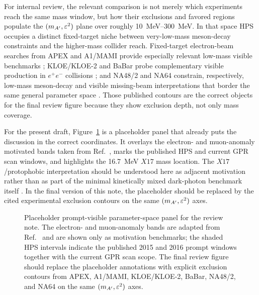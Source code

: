 For internal review, the relevant comparison is not merely which experiments reach the
same mass window, but how their exclusions and favored regions populate the
$(m_{A^\prime},\varepsilon^2)$ plane over roughly \SIrange{10}{300}{MeV}. In that space HPS
occupies a distinct fixed-target niche between very-low-mass meson-decay constraints
and the higher-mass collider reach. Fixed-target electron-beam searches from APEX and
A1/MAMI provide especially relevant low-mass visible benchmarks
\cite{APEX2011,A1MAMI2014}; KLOE/KLOE-2 and BaBar probe complementary visible
production in $e^+e^-$ collisions \cite{KLOE2013,KLOE22015,BaBarDarkPhoton2014}; and
NA48/2 and NA64 constrain, respectively, low-mass meson-decay and visible missing-beam
interpretations that border the same general parameter space
\cite{NA48DarkPhoton2015,NA64X17Visible2021}. Those published contours are the correct
objects for the final review figure because they show exclusion depth, not only mass
coverage.

For the present draft, Figure~\ref{fig:prompt-visible-constraints} is a placeholder
panel that already puts the discussion in the correct coordinates. It overlays the
electron- and muon-anomaly motivated bands taken from
Ref.~\cite{PeetsX17g2Comparison2026}, marks the published HPS and current GPR scan
windows, and highlights the \SI{16.7}{MeV} $X17$ mass location. The
$X17$/protophobic interpretation should be understood here as adjacent motivation
rather than as part of the minimal kinetically mixed dark-photon benchmark itself
\cite{Krasznahorkay2016,FengProtophobic2016}. In the final version of this note, the
placeholder should be replaced by the cited experimental exclusion contours on the same
$(m_{A^\prime},\varepsilon^2)$ axes.

\begin{figure}[H]
\centering
{}
\caption{Placeholder prompt-visible parameter-space panel for the review note. The
electron- and muon-anomaly bands are adapted from
Ref.~\cite{PeetsX17g2Comparison2026} and are shown only as motivation benchmarks; the
shaded HPS intervals indicate the published 2015 and 2016 prompt windows together with
the current GPR scan scope. The final review figure should replace the placeholder
annotations with explicit exclusion contours from APEX, A1/MAMI, KLOE/KLOE-2, BaBar,
NA48/2, and NA64 on the same $(m_{A^\prime},\varepsilon^2)$ axes.}
\label{fig:prompt-visible-constraints}
\end{figure}

